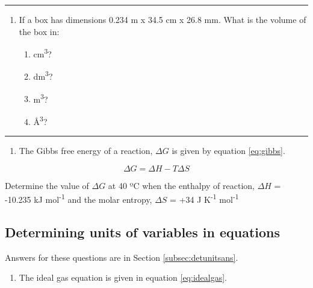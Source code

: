 \documentclass[
]{book}
\providecommand{\tightlist}{%
  \setlength{\itemsep}{0pt}\setlength{\parskip}{0pt}}
\begin{document}
\begin{center}\rule{0.5\linewidth}{0.5pt}\end{center}

\begin{enumerate}
\def\labelenumi{\arabic{enumi}.}
\setcounter{enumi}{1}
\tightlist
\item
  If a box has dimensions 0.234 m x 34.5 cm x 26.8 mm. What is the volume of the box in:

  \begin{enumerate}
  \def\labelenumii{\alph{enumii}.}
  \tightlist
  \item
    cm\textsuperscript{3}?
  \item
    dm\textsuperscript{3}?
  \item
    m\textsuperscript{3}?
  \item
    Å\textsuperscript{3}?
  \end{enumerate}
\end{enumerate}

\begin{center}\rule{0.5\linewidth}{0.5pt}\end{center}

\begin{enumerate}
\def\labelenumi{\arabic{enumi}.}
\setcounter{enumi}{2}
\tightlist
\item
  The Gibbs free energy of a reaction, \(\Delta G\) is given by equation \eqref{eq:gibbs}.
\end{enumerate}

\begin{equation}
\Delta G = \Delta H - T \Delta S
\label{eq:gibbs}
\end{equation}

Determine the value of \(\Delta G\) at 40 ºC when the enthalpy of reaction, \(\Delta H\) = -10.235 kJ mol\textsuperscript{-1} and the molar entropy, \(\Delta S\) = +34 J K\textsuperscript{-1} mol\textsuperscript{-1}

\hypertarget{subsec:detunits}{%
\subsection{Determining units of variables in equations}\label{subsec:detunits}}

Answers for these questions are in Section \ref{subsec:detunitsans}.

\begin{enumerate}
\def\labelenumi{\arabic{enumi}.}
\tightlist
\item
  The ideal gas equation is given in equation \eqref{eq:idealgas}.
\end{enumerate}
\end{document}
